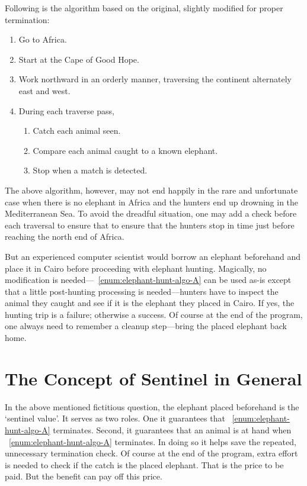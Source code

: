 Following is the algorithm based on the original, slightly modified for proper termination:
\begin{alisting}[H]
    \caption{\label{enum:elephant-hunt-algo-A}
    Algorithm for solving the `Elephant in Cairo' question.}
    \begin{enumerate}
        \item Go to Africa.
        \item Start at the Cape of Good Hope.
        \item Work northward in an orderly manner, traversing the continent alternately east and west.
        \item During each traverse pass,
        \begin{enumerate}
            \item Catch each animal seen.
            \item Compare each animal caught to a known elephant.
            \item Stop when a match is detected.
        \end{enumerate}
    \end{enumerate}
\end{alisting}
The above algorithm, however, may not end happily in the rare and
unfortunate case when there is no elephant in Africa and the hunters end up drowning in the
Mediterranean Sea.
To avoid the dreadful situation, one may add a check before each traversal to ensure
that to ensure that the hunters stop in time just before reaching the north end of Africa.


But an experienced computer scientist would borrow an elephant beforehand and place it
in Cairo before proceeding with elephant hunting.
Magically, no modification is needed---~\autoref{enum:elephant-hunt-algo-A} can be used as-is
except that a little post-hunting processing is needed---hunters have to inspect the animal they
caught and see if it is the elephant they placed in Cairo.
If yes, the hunting trip is a failure;
otherwise a success.
Of course at the end of the program, one always need to remember a cleanup step---bring
the placed elephant back home.


\section{The Concept of Sentinel in General}\label{sec:concept-of-sentinel}

In the above mentioned fictitious question, the elephant placed beforehand is the `sentinel value'.
It serves as two roles.
One it guarantees that ~\autoref{enum:elephant-hunt-algo-A} terminates.
Second, it guarantees that an animal is at hand when ~\autoref{enum:elephant-hunt-algo-A}
terminates.
In doing so it helps save the repeated, unnecessary termination check.
Of course at the end of the program, extra effort is needed to check
if the catch is the placed elephant.
That is the price to be paid.
But the benefit can pay off this price.


